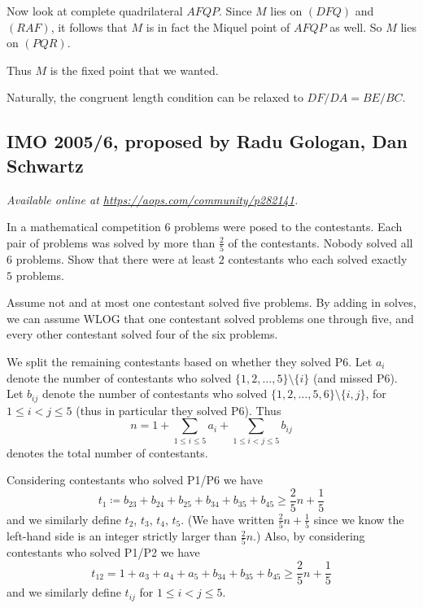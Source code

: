 \documentclass[11pt]{scrartcl}
\begin{document}
Now look at complete quadrilateral $AFQP$.
Since $M$ lies on $(DFQ)$ and $(RAF)$,
it follows that $M$ is in fact the Miquel point of $AFQP$ as well.
So $M$ lies on $(PQR)$.

Thus $M$ is the fixed point that we wanted.

\begin{remark*}
  Naturally, the congruent length
  condition can be relaxed to $DF/DA = BE/BC$.
\end{remark*}
\pagebreak

\subsection{IMO 2005/6, proposed by Radu Gologan, Dan Schwartz}
\textsl{Available online at \url{https://aops.com/community/p282141}.}
\begin{mdframed}[style=mdpurplebox,frametitle={Problem statement}]
In a mathematical competition $6$ problems were posed to the contestants.
Each pair of problems was solved by more than $\frac{2}{5}$ of the contestants.
Nobody solved all 6 problems.
Show that there were at least $2$ contestants
who each solved exactly $5$ problems.
\end{mdframed}
Assume not and at most one contestant solved five problems.
By adding in solves,
we can assume WLOG that one contestant solved problems one through five,
and every other contestant solved four of the six problems.

We split the remaining contestants based on whether they solved P6.
Let $a_i$ denote the number of contestants who solved
$\{1,2,\dots,5\} \setminus \{i\}$ (and missed P6).
Let $b_{ij}$ denote the number of contestants who solved
$\{1,2,\dots,5,6\} \setminus \{i,j\}$, for $1 \le i < j \le 5$
(thus in particular they solved P6).
Thus
\[ n = 1 + \sum_{1 \le i \le 5} a_i + \sum_{1 \le i < j \le 5} b_{ij} \]
denotes the total number of contestants.

Considering contestants who solved P1/P6 we have
\[ t_1 \coloneqq b_{23} + b_{24} + b_{25} + b_{34} + b_{35} + b_{45} \ge \frac25n + \frac15 \]
and we similarly define $t_2$, $t_3$, $t_4$, $t_5$.
(We have written $\frac25n+\frac15$ since we know
the left-hand side is an integer strictly larger than $\frac25n$.)
Also, by considering contestants who solved P1/P2 we have
\[ t_{12} = 1 + a_{3} + a_{4} + a_{5} + b_{34} + b_{35} + b_{45}
  \ge \frac25n + \frac15 \]
and we similarly define $t_{ij}$ for $1 \le i < j \le 5$.
\end{document}
